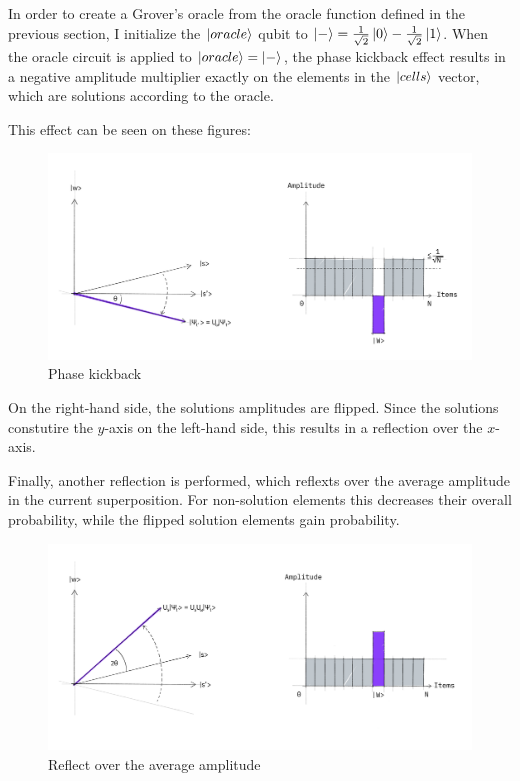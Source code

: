 In order to create a Grover's oracle from the oracle function defined in the previous section, I initialize the $\ket{oracle}$ qubit to $\ket{-} = \frac{1}{\sqrt{2}}\ket{0} - \frac{1}{\sqrt{2}}\ket{1}$. When the oracle circuit is applied to $\ket{oracle} = \ket{-}$, the phase kickback effect results in a negative amplitude multiplier exactly on the elements in the $\ket{cells}$ vector, which are solutions according to the oracle.

This effect can be seen on these figures:

\begin{figure}[H]
  \centering
    \includegraphics[width=\linewidth]{content/assets/03_grovers_algorithm/grover_step2.jpg}
    \caption{Phase kickback}
\end{figure}

On the right-hand side, the solutions amplitudes are flipped. Since the solutions constutire the $y$-axis on the left-hand side, this results in a reflection over the $x$-axis.

Finally, another reflection is performed, which reflexts over the average amplitude in the current superposition. For non-solution elements this decreases their overall probability, while the flipped solution elements gain probability.
\begin{figure}[H]
  \centering
    \includegraphics[width=\linewidth]{content/assets/03_grovers_algorithm/grover_step3.jpg}
    \caption{Reflect over the average amplitude}
\end{figure}


